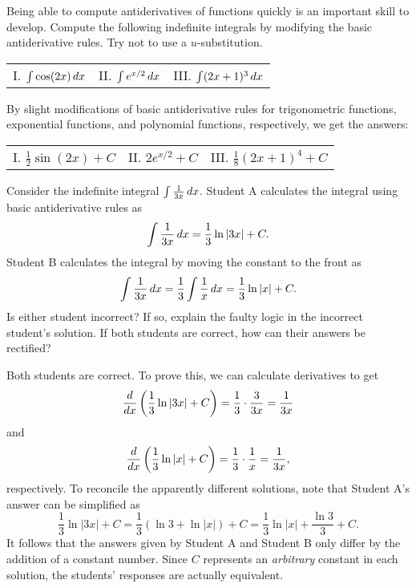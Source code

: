 \documentclass[handout]{ximera}
\begin{document}
\begin{problem}
Being able to compute antiderivatives of functions quickly is an important skill to develop.  Compute the following indefinite integrals by modifying the basic antiderivative rules.  Try not to use a $u$-substitution.

\begin{center}
\begin{tabular}{lll} 
I. $\int \cos(2x) \mathop{}\!d x$ \hspace{.7in} & II. $\int e^{x/2} \mathop{}\!d x$ \hspace{.7in} & III. $\int (2x+1)^3 \mathop{}\!d x$
\end{tabular}
\end{center}

\end{problem}

\begin{freeResponse} By slight modifications of basic antiderivative rules for trigonometric functions, exponential functions, and polynomial functions, respectively, we get the answers:

\begin{tabular}{lll} 
I. $\frac{1}{2} \sin(2x) + C$ \hspace{.7in} & II. $2 e^{x/2} + C$ \hspace{.7in} & III. $\frac{1}{8} (2x+1)^4 + C$
\end{tabular}
\end{freeResponse}

\begin{problem}
Consider the indefinite integral $\int \frac{1}{3x} \mathop{}\!d x$. Student A calculates the integral using basic antiderivative rules as
$$
\int \frac{1}{3x} \mathop{}\!d x = \frac{1}{3} \ln |3x| + C.
$$
Student B calculates the integral by moving the constant to the front as 
$$
\int \frac{1}{3x} \mathop{}\!d x = \frac{1}{3} \int \frac{1}{x} \mathop{}\!d x = \frac{1}{3} \ln |x| + C.
$$
Is either student incorrect?  If so, explain the faulty logic in the incorrect student's solution.  If both students are correct, how can their answers be rectified?

\end{problem}

\begin{freeResponse} Both students are correct. To prove this, we can calculate derivatives to get
$$
\frac{\mathop{}\!d}{\mathop{}\!d x} \left(\frac{1}{3} \ln |3x| + C\right) = \frac{1}{3} \cdot  \frac{3}{3x} = \frac{1}{3x}
$$
and 
$$
\frac{\mathop{}\!d}{\mathop{}\!d x} \left(\frac{1}{3} \ln |x| + C\right) = \frac{1}{3} \cdot \frac{1}{x} = \frac{1}{3x},
$$
respectively. To reconcile the apparently different solutions, note that Student A's answer can be simplified as
$$
\frac{1}{3} \ln |3x| + C = \frac{1}{3} \left(\ln 3 + \ln |x|\right) + C = \frac{1}{3} \ln |x| + \frac{\ln 3}{3} + C.
$$
It follows that the answers given by Student A and Student B only differ by the addition of a constant number. Since $C$ represents an \textit{arbitrary} constant in each solution, the students' responses are actually equivalent.
\end{freeResponse}
\end{document}
